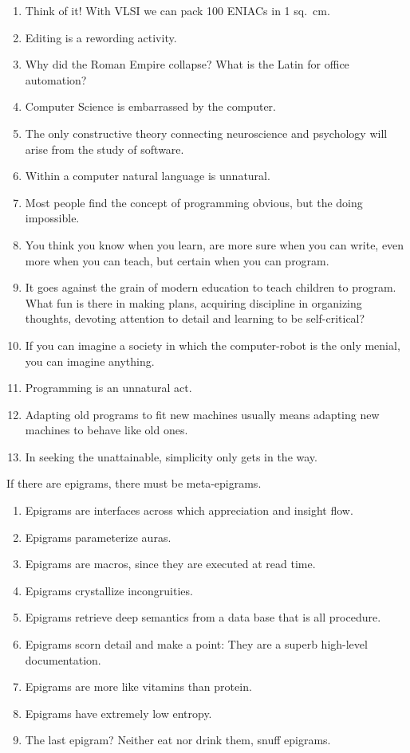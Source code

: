 \documentclass[letterpaper,11pt]{article}
\begin{document}
\begin{multicols}{2}
\begin{enumerate}[wide=0pt,label=\textbf{\arabic*.}]
\item Think of it! With VLSI we can pack 100 ENIACs in 1 sq.\ cm.
\item Editing is a rewording activity.
\item Why did the Roman Empire collapse? What is the Latin for office automation?
\item Computer Science is embarrassed by the computer.
\item The only constructive theory connecting neuroscience and psychology will arise from the study of software.
\item Within a computer natural language is unnatural.
\item Most people find the concept of programming obvious, but the doing impossible.
\item You think you know when you learn, are more sure when you can write, even more when you can teach, but certain when you can program.
\item It goes against the grain of modern education to teach children to program. What fun is there in making plans, acquiring discipline in organizing thoughts, devoting attention to detail and learning to be self-critical?
\item If you can imagine a society in which the computer-robot is the only menial, you can imagine anything.
\item Programming is an unnatural act.
\item Adapting old programs to fit new machines usually means adapting new machines to behave like old ones.
\item In seeking the unattainable, simplicity only gets in the way.
\end{enumerate}
%
If there are epigrams, there must be meta-epigrams.
%
\begin{enumerate}[resume,wide=0pt,label=\textbf{\arabic*.}]
\item Epigrams are interfaces across which appreciation and insight flow.
\item Epigrams parameterize auras.
\item Epigrams are macros, since they are executed at read time.
\item Epigrams crystallize incongruities.
\item Epigrams retrieve deep semantics from a data base that is all procedure.
\item Epigrams scorn detail and make a point: They are a superb high-level documentation.
\item Epigrams are more like vitamins than protein.
\item Epigrams have extremely low entropy.
\item The last epigram? Neither eat nor drink them, snuff epigrams.
\end{enumerate}
\end{multicols}
\end{document}
